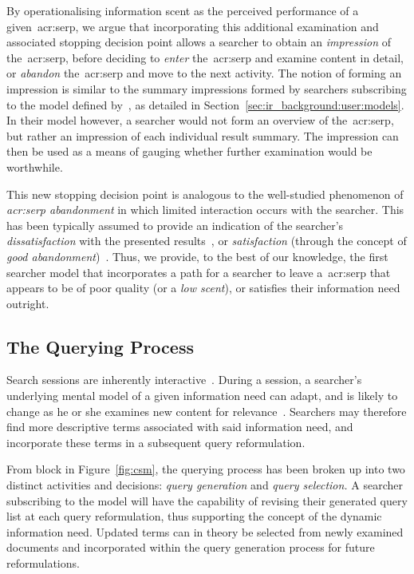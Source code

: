 By operationalising information scent as the perceived performance of a given~\gls{acr:serp}, we argue that incorporating this additional examination and associated stopping decision point allows a searcher to obtain an \emph{impression} of the~\gls{acr:serp}, before deciding to \emph{enter} the~\gls{acr:serp} and examine content in detail, or \emph{abandon} the~\gls{acr:serp} and move to the next activity. The notion of forming an impression is similar to the summary impressions formed by searchers subscribing to the model defined by~\cite{thomas2014modelling_behaviour}, as detailed in Section~\ref{sec:ir_background:user:models}. In their model however, a searcher would not form an overview of the~\gls{acr:serp}, but rather an impression of each individual result summary. The impression can then be used as a means of gauging whether further examination would be worthwhile.

This new stopping decision point is analogous to the well-studied phenomenon of \emph{\gls{acr:serp} abandonment} in which limited interaction occurs with the searcher. This has been typically assumed to provide an indication of the searcher's \emph{dissatisfaction} with the presented results~\citep{dassarma2008serp_abandonment, chuklin2012serp_abandonment, kiseleva2015serp_fails}, or \emph{satisfaction} (through the concept of \emph{good abandonment})~\citep{loumakis2011image_smells, wu2014information_scent}. Thus, we provide, to the best of our knowledge, the first searcher model that incorporates a path for a searcher to leave a~\gls{acr:serp} that appears to be of poor quality (or a \emph{low scent}), or satisfies their information need outright.

\subsection{The Querying Process}\label{sec:csm:advancements:querying}
Search sessions are inherently interactive~\citep{ingwersen2005theturn}. During a session, a searcher's underlying mental model of a given information need can adapt, and is likely to change as he or she examines new content for relevance~\citep{borlund2003iir_model}. Searchers may therefore find more descriptive terms associated with said information need, and incorporate these terms in a subsequent query reformulation.

From block  in Figure~\ref{fig:csm}, the querying process has been broken up into two distinct activities and decisions: \emph{query generation} and \emph{query selection.} A searcher subscribing to the model will have the capability of revising their generated query list at each query reformulation, thus supporting the concept of the dynamic information need. Updated terms can in theory be selected from newly examined documents and incorporated within the query generation process for future reformulations.

